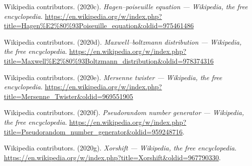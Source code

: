 \documentclass[
]{article}
\newlength{\cslhangindent}
\newenvironment{cslreferences}%
  {\setlength{\parindent}{0pt}%
  \everypar{\setlength{\hangindent}{\cslhangindent}}\ignorespaces}%
  {\par}
\begin{document}
\begin{cslreferences}
\leavevmode\hypertarget{ref-wiki:poseuille_equation}{}%
Wikipedia contributors. (2020c). \emph{Hagen--poiseuille equation ---
Wikipedia, the free encyclopedia}.
\url{https://en.wikipedia.org/w/index.php?title=Hagen\%E2\%80\%93Poiseuille_equation\&oldid=975461486}

\leavevmode\hypertarget{ref-wiki:maxwell_boltzmann}{}%
Wikipedia contributors. (2020d). \emph{Maxwell--boltzmann distribution
--- Wikipedia, the free encyclopedia}.
\url{https://en.wikipedia.org/w/index.php?title=Maxwell\%E2\%80\%93Boltzmann_distribution\&oldid=978374316}

\leavevmode\hypertarget{ref-wiki:mersennetwister}{}%
Wikipedia contributors. (2020e). \emph{Mersenne twister --- Wikipedia,
the free encyclopedia}.
\url{https://en.wikipedia.org/w/index.php?title=Mersenne_Twister\&oldid=969551905}

\leavevmode\hypertarget{ref-wiki:prng}{}%
Wikipedia contributors. (2020f). \emph{Pseudorandom number generator ---
Wikipedia, the free encyclopedia}.
\url{https://en.wikipedia.org/w/index.php?title=Pseudorandom_number_generator\&oldid=959248716}.

\leavevmode\hypertarget{ref-wiki:xorshift}{}%
Wikipedia contributors. (2020g). \emph{Xorshift --- Wikipedia, the free
encyclopedia}.
\url{https://en.wikipedia.org/w/index.php?title=Xorshift\&oldid=967790330}.
\end{cslreferences}
\end{document}
